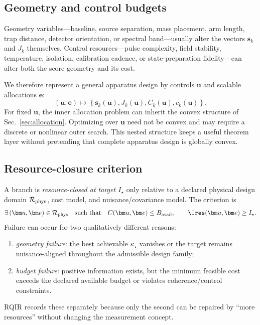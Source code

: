 \subsection{Geometry and control budgets}

Geometry variables---baseline, source separation, mass placement, arm length, trap distance, detector orientation, or spectral band---usually alter the vectors $\bm s_k$ and $J_k$ themselves. Control resources---pulse complexity, field stability, temperature, isolation, calibration cadence, or state-preparation fidelity---can alter both the score geometry and its cost.

We therefore represent a general apparatus design by controls $\bm u$ and scalable allocations $\bm e$:
\begin{equation}
 (\bm u,\bm e)
 \longmapsto
 \left\{
 \bm s_k(\bm u),J_k(\bm u),C_k(\bm u),c_k(\bm u)
 \right\}.
\label{eq:apparatus-map}
\end{equation}
For fixed $\bm u$, the inner allocation problem can inherit the convex structure of Sec.~\ref{sec:allocation}. Optimizing over $\bm u$ need not be convex and may require a discrete or nonlinear outer search. This nested structure keeps a useful theorem layer without pretending that complete apparatus design is globally convex.

\subsection{Resource-closure criterion}

A branch is \emph{resource-closed at target $I_\star$} only relative to a declared physical design domain $\mathcal R_{\rm phys}$, cost model, and nuisance/covariance model. The criterion is
\begin{equation}
 \exists\,(\bm u,\bm e)\in\mathcal R_{\rm phys}
 \quad\text{such that}\quad
 C(\bm u,\bm e)\le B_{\rm avail},
 \qquad
 \Ires(\bm u,\bm e)\ge I_\star.
\label{eq:resource-closure}
\end{equation}
Failure can occur for two qualitatively different reasons:
\begin{enumerate}
 \item \emph{geometry failure}: the best achievable $\kappa_\star$ vanishes or the target remains nuisance-aligned throughout the admissible design family;
 \item \emph{budget failure}: positive information exists, but the minimum feasible cost exceeds the declared available budget or violates coherence/control constraints.
\end{enumerate}
RQIR records these separately because only the second can be repaired by ``more resources'' without changing the measurement concept.

